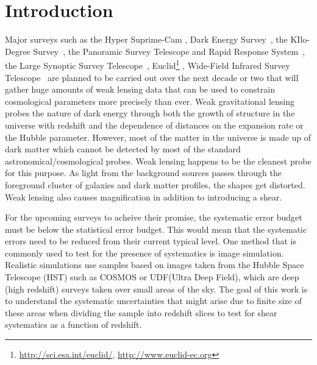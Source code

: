 \documentclass[twocolumn,useAMS,usenatbib]{mn2e}
\newcommand{\rachel}[1]{{\textcolor{red}{#1}}}
\begin{document}
\section{Introduction}
\label{S:intro}

Major surveys such as the Hyper Suprime-Cam \citep[HSC;][]{HSC_Overview}, Dark Energy Survey~\citep[DES;][]{DESC}, the KIlo-Degree Survey~\citep[KIDS;][]{KIDS}, the Panoramic Survey Telescope and Rapid Response System~\citep[PanSTARRS;][]{PanSTARRS_2010},
the Large Synoptic Survey Telescope~\citep[LSST;][]{LSST_Book}, Euclid\footnote{\url{http://sci.esa.int/euclid/}, \url{http://www.euclid-ec.org}} \citep{EuclidReport},
Wide-Field Infrared Survey Telescope~\citep[WFIRST;][]{WFIRST_Final}
are planned to be carried out over the next decade or two that will gather huge amounts of weak lensing data that can be used to constrain cosmological parameters more precisely than ever.
Weak gravitational lensing probes the nature of dark energy through both the growth of structure in the universe with redshift and the dependence of distances on the expansion rate or the Hubble parameter.
However, most of the matter in the universe is made up of dark matter which cannot be detected by most of the standard astronomical/cosmological probes. Weak lensing happens to be the cleanest probe for this purpose.
As light from the background sources passes through the foreground cluster of galaxies and dark matter profiles, the shapes get distorted. Weak lensing also causes magnification in addition to introducing a shear.

For the upcoming surveys to acheive their promise, the systematic error budget must be below the statistical error budget. This would mean that the systematic errors need to be reduced from their current typical level.
One method that is commonly used to test for the presence of systematics is image simulation. Realistic simulations use samples based on images taken from the Hubble Space Telescope (HST) such as COSMOS or UDF(Ultra Deep Field), which are deep (high redshift) surveys taken over small areas of the sky.
The goal of this work is to understand the systematic uncertainties that might arise due to finite size of these areas when dividing the sample into redshift slices to test for 
shear systematics as a function of redshift.
\end{document}
